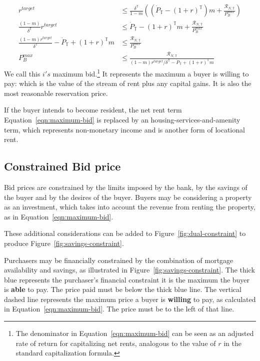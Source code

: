 {\begin{align}
r^{target}& \le \frac{\delta^\mathbb{T}}{1-m} \left((\dot P_\mathbb{T} - (1+r)^\mathbb{T})m  + \frac{\mathcal{R}_{N, \mathbb{T}}}{P_B^{max}}\right)\nonumber\\
\frac{(1-m)}{\delta^\mathbb{T}}r^{target} &\le \dot P_\mathbb{T} - (1+r)^\mathbb{T}m  +   \frac{\mathcal{R}_{N, \mathbb{T}}}{P_B^{max}} \nonumber\\
\frac{(1-m)r^{target}}{\delta^\mathbb{T}} - \dot P_\mathbb{T} + (1+r)^\mathbb{T}m &\le  \frac{\mathcal{R}_{N, \mathbb{T}}}{P_B^{max}}\nonumber\\
P_B^{max} &\le  \frac{\mathcal{R}_{N, \mathbb{T}}}{(1-m)r^{target}/\delta^\mathbb{T} - \dot P_\mathbb{T} + (1+r)^\mathbb{T}m} \label{eqn:maximum-bid}
\end{align}
We call this  $i's$ maximum bid.\footnote{The denominator in Equation~\ref{eqn:maximum-bid} can be seen as an adjusted rate of return for capitalizing net rents, analogous to the value of $r$ in  the standard capitalization formula.} 
It represents the maximum a buyer is willing to pay: which is the value of the stream of rent plus any capital gains.  It is also  the most reasonable reservation  price.%

If the buyer intends to become resident, the net rent term Equation~\ref{eqn:maximum-bid} is replaced by an housing-services-and-amenity term, which represents non-monetary income and is another form of locational rent. 


\subsection{Constrained Bid price}
Bid prices are constrained by the limits imposed by the bank, by the savings of the buyer and by the desires of the buyer. Buyers may be considering a property as an investment, which takes into account the revenue from renting the property,  as in Equation~\ref{eqn:maximum-bid}. 

These additional considerations can be added to Figure~\ref{fig:dual-constraint} to produce Figure~\ref{fig:savings-constraint}.
 
Purchasers may be financially constrained by the combination of mortgage availability and savings, as illustrated in Figure~\ref{fig:savings-constraint}. The thick blue represents the purchaser's financial constraint it is the maximum the buyer is \textbf{able} to pay. The price paid must be below the thick blue line. The vertical dashed line represents the maximum price a buyer is \textbf{willing} to pay, as calculated in Equation~\ref{eqn:maximum-bid}. The price must be to the left of that line.

}
